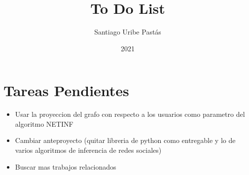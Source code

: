 \documentclass{article}
\title{To Do List}
\author{Santiago Uribe Pastás}
\date{2021}
\begin{document}
\maketitle

\section{Tareas Pendientes}
\begin{itemize}
    \item Usar la proyeccion del grafo con respecto a los usuarios como parametro del algoritmo NETINF
    \item Cambiar anteproyecto (quitar libreria de python como entregable y lo de varios algoritmos de inferencia de redes sociales)
    \item Buscar mas trabajos relacionados
\end{itemize}
\end{document}
